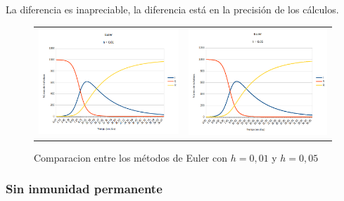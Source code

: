 \documentclass[11pt,a4paper]{report}
\begin{document}
La diferencia es inapreciable, la diferencia está en la precisión de los cálculos.

\begin{figure}[H]
\begin{tabular}{ll}
\includegraphics[scale=0.25]{img/inmunidad/euler-0-01.png}
&
\includegraphics[scale=0.25]{img/inmunidad/euler-0-5.png}
\end{tabular}
\caption{Comparacion entre los métodos de Euler con $h = 0,01$ y $h = 0,05$}
\end{figure}

\newpage
\subsubsection{Sin inmunidad permanente}
\end{document}
